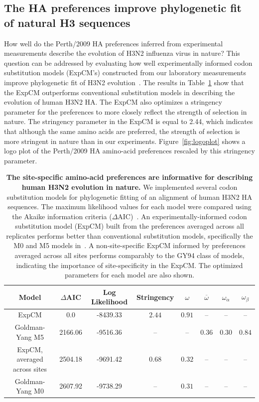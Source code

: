 \documentclass[11pt]{article}
\begin{document}
\subsection*{The HA preferences improve phylogenetic fit of natural H3 sequences}
How well do the Perth/2009 HA preferences inferred from experimental measurements describe the evolution of H3N2 influenza virus in nature?
This question can be addressed by evaluating how well experimentally informed codon substitution models (ExpCM's) constructed from our laboratory measurements improve phylogenetic fit of H3N2 evolution~\citep{hilton2017phydms}.
The results in Table~\ref{tab:phydms} show that the ExpCM outperforms conventional substitution models in describing the evolution of human H3N2 HA. 
The ExpCM also optimizes a stringency parameter for the preferences to more closely reflect the strength of selection in nature.
The stringency parameter in the ExpCM is equal to 2.44, which indicates that although the same amino acids are preferred, the strength of selection is more stringent in nature than in our experiments.
Figure~\ref{fig:logoplot} shows a logo plot of the Perth/2009 HA amino-acid preferences rescaled by this stringency parameter.

\begin{table}
\centering
\begin{tabular}{cccccccc}
\hline
\bf{Model} & \bf{$\Delta$AIC} & \bf{Log Likelihood} & \bf{Stringency} & \bf{$\omega$} & \bf{$\overline{\omega}$} & \bf{$\omega_{\alpha}$} & \bf{$\omega_{\beta}$} \\ \hline
ExpCM & 0.0 & -8439.33 & $2.44$ & $0.91$ & -- & -- & -- \\
Goldman-Yang M5 & 2166.06 & -9516.36 & -- & -- & $0.36$ & $0.30$ & $0.84$ \\
ExpCM, averaged across sites & 2504.18 & -9691.42 & $0.68$ & $0.32$ & -- & -- & -- \\
Goldman-Yang M0 & 2607.92 & -9738.29 & -- & $0.31$ & -- & -- & -- \\
\hline
\end{tabular}
\caption{\label{tab:phydms}
{\bf The site-specific amino-acid preferences are informative for describing human H3N2 evolution in nature.}
We implemented several codon substitution models for phylogenetic fitting of an alignment of human H3N2 HA sequences. 
The maximum likelihood values for each model were compared using the Akaike information criteria ($\Delta$AIC)~\citep{posada2004model}.
An experimentally-informed codon substitution model (ExpCM) built from the preferences averaged across all replicates performs better than conventional substitution models, specifically the M0 and M5 models in~\cite{yang2000codon}.
A non-site-specific ExpCM informed by preferences averaged across all sites performs comparably to the GY94 class of models, indicating the importance of site-specificity in the ExpCM.
The optimized parameters for each model are also shown.
}
\end{table}
\end{document}

